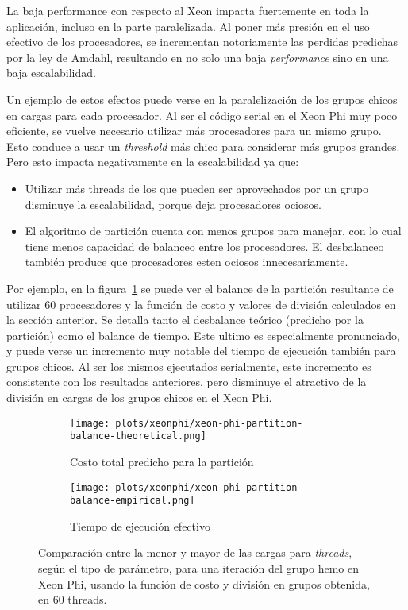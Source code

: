 La baja performance con respecto al Xeon impacta fuertemente en toda
la aplicaci\'on, incluso en la parte paralelizada. Al poner m\'as presi\'on en
el uso efectivo de los procesadores, se incrementan notoriamente las perdidas
predichas por la ley de Amdahl, resultando en no solo una baja \textit{performance}
sino en una baja escalabilidad.

Un ejemplo de estos efectos puede verse en la paralelizaci\'on de los grupos chicos
en cargas para cada procesador. Al ser el c\'odigo serial en el Xeon Phi muy poco
eficiente, se vuelve necesario utilizar m\'as procesadores para un mismo grupo.
Esto conduce a usar un \textit{threshold} m\'as chico para considerar
m\'as grupos grandes. Pero esto impacta negativamente en la escalabilidad ya que:

\begin{itemize}
    \item Utilizar m\'as threads de los que pueden ser aprovechados por un grupo
    disminuye la escalabilidad, porque deja procesadores ociosos.
    \item El algoritmo de partici\'on cuenta con menos grupos para manejar, con
    lo cual tiene menos capacidad de balanceo entre los procesadores. El
    desbalanceo tambi\'en produce que procesadores esten ociosos innecesariamente.
\end{itemize}

Por ejemplo, en la figura~\ref{fig:partition-balance} se puede ver el balance
de la partici\'on resultante de utilizar 60 procesadores y la funci\'on de costo
y valores de divisi\'on calculados en la secci\'on anterior. Se detalla tanto
el desbalance te\'orico (predicho por la partici\'on) como el balance de tiempo.
Este ultimo es especialmente pronunciado, y puede verse un incremento
muy notable del tiempo de ejecuci\'on tambi\'en para grupos chicos. Al ser
los mismos ejecutados serialmente, este incremento es consistente con los
resultados anteriores, pero disminuye el atractivo de la divisi\'on en cargas de
los grupos chicos en el Xeon Phi.

\begin{figure}[htbp]
   \centering
   \begin{subfigure}[b]{\plotwidthtres}
     \texttt{[image: plots/xeonphi/xeon-phi-partition-balance-theoretical.png]}
     \caption{Costo total predicho para la partici\'on}
   \end{subfigure}
   \begin{subfigure}[b]{\plotwidthtres}
       \texttt{[image: plots/xeonphi/xeon-phi-partition-balance-empirical.png]}
     \caption{Tiempo de ejecuci\'on efectivo}
   \end{subfigure}
   \caption{Comparaci\'on entre la menor y mayor de las cargas para \textit{threads},
   seg\'un el tipo de parámetro, para una iteraci\'on del grupo hemo en Xeon Phi, usando
   la funci\'on de costo y divisi\'on en grupos obtenida, en 60 threads.}
   \label{fig:partition-balance}
\end{figure}

